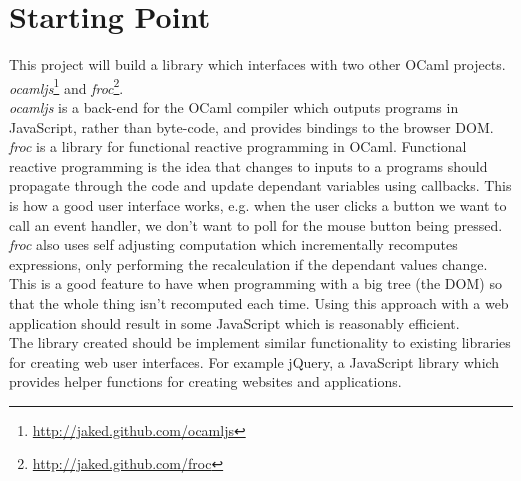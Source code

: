 \documentclass[10pt,a4paper]{article}
\begin{document}
  \section{Starting Point}
  This project will build a library which interfaces with two other OCaml projects. \emph{ocamljs}\footnote{\url{http://jaked.github.com/ocamljs}} and \emph{froc}\footnote{\url{http://jaked.github.com/froc}}.
  \\
  \emph{ocamljs} is a back-end for the OCaml compiler which outputs programs in JavaScript, rather than byte-code, and provides bindings to the browser DOM. \emph{froc} is a library for functional reactive programming in OCaml. Functional reactive programming is the idea that changes to inputs to a programs should propagate through the code and update dependant variables using callbacks. This is how a good user interface works, e.g. when the user clicks a button we want to call an event handler, we don't want to poll for the mouse button being pressed. \emph{froc} also uses self adjusting computation which incrementally recomputes expressions, only performing the recalculation if the dependant values change. This is a good feature to have when programming with a big tree (the DOM) so that the whole thing isn't recomputed each time. Using this approach with a web application should result in some JavaScript which is reasonably efficient.
  \\
  The library created should be implement similar functionality to existing libraries for creating web user interfaces. For example jQuery, a JavaScript library which provides helper functions for creating websites and applications. 
\end{document}
